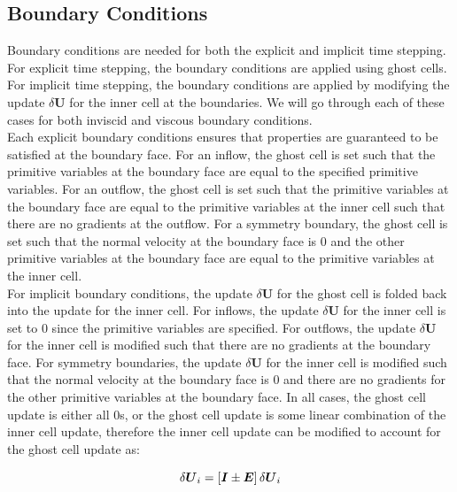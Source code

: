\documentclass[10pt]{article}
\begin{document}
\begin{flushleft}
\subsection{Boundary Conditions}

Boundary conditions are needed for both the explicit and implicit time stepping. For explicit time stepping, the boundary conditions are applied using ghost cells. For implicit time stepping, the boundary conditions are applied by modifying the update $\delta \boldsymbol{U}$ for the inner cell at the boundaries. We will go through each of these cases for both inviscid and viscous boundary conditions. 
\\
\vspace{5mm}
Each explicit boundary conditions ensures that properties are guaranteed to be satisfied at the boundary face. For an inflow, the ghost cell is set such that the primitive variables at the boundary face are equal to the specified primitive variables. For an outflow, the ghost cell is set such that the primitive variables at the boundary face are equal to the primitive variables at the inner cell such that there are no gradients at the outflow. For a symmetry boundary, the ghost cell is set such that the normal velocity at the boundary face is 0 and the other primitive variables at the boundary face are equal to the primitive variables at the inner cell. 
\\
\vspace{5mm}
For implicit boundary conditions, the update $\delta \boldsymbol{U}$ for the ghost cell is folded back into the update for the inner cell. For inflows, the update $\delta \boldsymbol{U}$ for the inner cell is set to 0 since the primitive variables are specified. For outflows, the update $\delta \boldsymbol{U}$ for the inner cell is modified such that there are no gradients at the boundary face. For symmetry boundaries, the update $\delta \boldsymbol{U}$ for the inner cell is modified such that the normal velocity at the boundary face is 0 and there are no gradients for the other primitive variables at the boundary face. In all cases, the ghost cell update is either all 0s, or the ghost cell update is some linear combination of the inner cell update, therefore the inner cell update can be modified to account for the ghost cell update as:

\begin{equation}
    \delta \boldsymbol{U}_i = \left[ \boldsymbol{I} \pm \boldsymbol{E} \right] \delta \boldsymbol{U}_i
\end{equation}


\end{flushleft}
\end{document}
